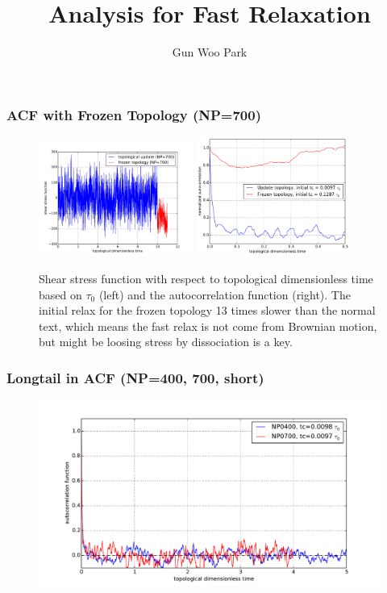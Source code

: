 \documentclass[slidestop, compress, mathserif]{beamer}
\title{Analysis for Fast Relaxation}
\author{Gun Woo Park}
\begin{document}
\begin{frame}[plain]
\maketitle
\end{frame}


\begin{frame}
  \frametitle<presentation>{ACF with Frozen Topology (NP=700)}
  \begin{figure}
    \centering
    \includegraphics[width=0.45\textwidth]{../check_stress_function_frozen.pdf}
    \includegraphics[width=0.45\textwidth]{../check_frozen_topology.pdf}
    \caption{Shear stress function with respect to topological dimensionless time based on $\tau_0$ (left) and the autocorrelation function (right). The initial relax for the frozen topology 13 times slower than the normal text, which means the fast relax is not come from Brownian motion, but might be loosing stress by dissociation is a key.}
  \end{figure}
\end{frame}

\begin{frame}
  \frametitle<presentation>{Longtail in ACF (NP=400, 700, short)}
  \begin{figure}
    \centering
    \includegraphics[width=\textwidth]{../check_longtail.pdf}
  \end{figure}
\end{frame}
\end{document}
